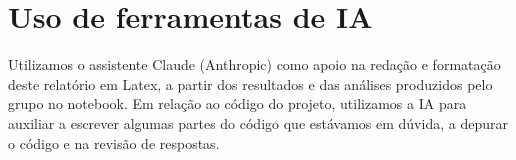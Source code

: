 \documentclass[10pt,a4paper]{article}
\begin{document}
\section{Uso de ferramentas de IA}

Utilizamos o assistente Claude (Anthropic) como apoio na redação e formatação deste relatório em Latex, a partir dos resultados e das análises produzidos pelo grupo no notebook. Em relação ao código do projeto, utilizamos a IA para auxiliar a escrever algumas partes do código que estávamos em dúvida, a depurar o código e na revisão de respostas.
\end{document}
